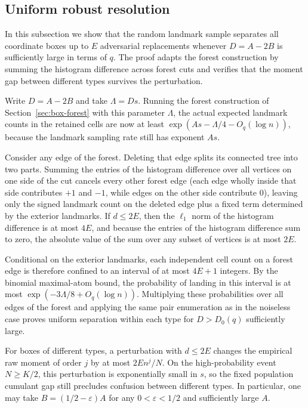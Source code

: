 \subsection{Uniform robust resolution}\label{sec:robust-forest}
In this subsection we show that the random landmark sample separates all coordinate boxes up to $E$ adversarial replacements whenever $D=A-2B$ is sufficiently large in terms of $q$. The proof adapts the forest construction by summing the histogram difference across forest cuts and verifies that the moment gap between different types survives the perturbation.

Write $D=A-2B$ and take $\Lambda=Ds$. Running the forest construction of Section~\ref{sec:box-forest} with this parameter $\Lambda$, the actual expected landmark counts in the retained cells are now at least $\exp(As-\Lambda/4-O_q(\log n))$, because the landmark sampling rate still has exponent $As$.

Consider any edge of the forest. Deleting that edge splits its connected tree into two parts. Summing the entries of the histogram difference over all vertices on one side of the cut cancels every other forest edge (each edge wholly inside that side contributes $+1$ and $-1$, while edges on the other side contribute $0$), leaving only the signed landmark count on the deleted edge plus a fixed term determined by the exterior landmarks. If $d\le2E$, then the $\ell_1$ norm of the histogram difference is at most $4E$, and because the entries of the histogram difference sum to zero, the absolute value of the sum over any subset of vertices is at most $2E$.

Conditional on the exterior landmarks, each independent cell count on a forest edge is therefore confined to an interval of at most $4E+1$ integers. By the binomial maximal-atom bound, the probability of landing in this interval is at most $\exp(-3\Lambda/8+O_q(\log n))$. Multiplying these probabilities over all edges of the forest and applying the same pair enumeration as in the noiseless case proves uniform separation within each type for $D>D_0(q)$ sufficiently large.

For boxes of different types, a perturbation with $d\le2E$ changes the empirical raw moment of order $j$ by at most $2En^j/N$. On the high-probability event $N\ge K/2$, this perturbation is exponentially small in $s$, so the fixed population cumulant gap still precludes confusion between different types. In particular, one may take $B=(1/2-\varepsilon)A$ for any $0<\varepsilon<1/2$ and sufficiently large $A$.

